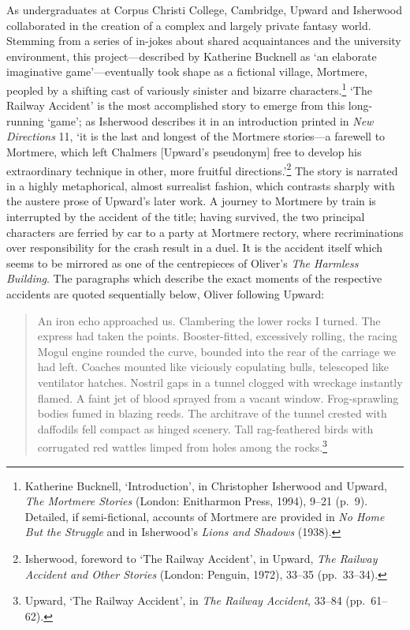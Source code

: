 \documentclass[]{article}
\begin{document}
As undergraduates at Corpus Christi College, Cambridge, Upward and
Isherwood collaborated in the creation of a complex and largely private
fantasy world. Stemming from a series of in-jokes about shared
acquaintances and the university environment, this project—described by
Katherine Bucknell as ‘an elaborate imaginative game’—eventually took
shape as a fictional village, Mortmere, peopled by a shifting cast of
variously sinister and bizarre characters.\footnote{Katherine Bucknell,
  ‘Introduction’, in Christopher Isherwood and Upward, \emph{The
  Mortmere Stories} (London: Enitharmon Press, 1994), 9–21 (p.~9).
  Detailed, if semi-fictional, accounts of Mortmere are provided in
  \emph{No Home But the Struggle} and in Isherwood’s \emph{Lions and
  Shadows} (1938).} ‘The Railway Accident’ is the most accomplished
story to emerge from this long-running ‘game’; as Isherwood describes it
in an introduction printed in \emph{New Directions} 11, ‘it is the last
and longest of the Mortmere stories—a farewell to Mortmere, which left
Chalmers {[}Upward’s pseudonym{]} free to develop his extraordinary
technique in other, more fruitful directions.’\footnote{Isherwood,
  foreword to ‘The Railway Accident’, in Upward, \emph{The Railway
  Accident and Other Stories} (London: Penguin, 1972), 33–35
  (pp.~33–34).} The story is narrated in a highly metaphorical, almost
surrealist fashion, which contrasts sharply with the austere prose of
Upward’s later work. A journey to Mortmere by train is interrupted by
the accident of the title; having survived, the two principal characters
are ferried by car to a party at Mortmere rectory, where recriminations
over responsibility for the crash result in a duel. It is the accident
itself which seems to be mirrored as one of the centrepieces of Oliver’s
\emph{The Harmless Building}. The paragraphs which describe the exact
moments of the respective accidents are quoted sequentially below,
Oliver following Upward:

\begin{quote}
\singlespacing An iron echo approached us. Clambering the lower rocks I
turned. The express had taken the points. Booster-fitted, excessively
rolling, the racing Mogul engine rounded the curve, bounded into the
rear of the carriage we had left. Coaches mounted like viciously
copulating bulls, telescoped like ventilator hatches. Nostril gaps in a
tunnel clogged with wreckage instantly flamed. A faint jet of blood
sprayed from a vacant window. Frog-sprawling bodies fumed in blazing
reeds. The architrave of the tunnel crested with daffodils fell compact
as hinged scenery. Tall rag-feathered birds with corrugated red wattles
limped from holes among the rocks.\footnote{Upward, ‘The Railway
  Accident’, in \emph{The Railway Accident}, 33–84 (pp.~61–62).}
\end{quote}
\end{document}
